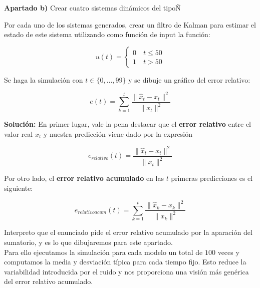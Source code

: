 \documentclass[a4paper]{article}
\begin{document}
\textbf{Apartado b)} Crear cuatro sistemas dinámicos del tipoÑ

Por cada uno de los sistemas generados, crear un filtro de Kalman para estimar el estado de este sistema utilizando como función de input la función:

\[
	u(t) = \begin{cases}
		0 \quad t \le 50 \\
		1 \quad t > 50
	\end{cases}
\]

Se haga la simulación con $t \in \{0, \ldots, 99\}$ y se dibuje un gráfico del error relativo:

\[
	e(t) = \sum_{k=1}^{t} \frac{\parallel\hat x_t - x_t\parallel^2}{\parallel x_t \parallel^2}
\]

\textbf{Solución:} En primer lugar, vale la pena destacar que el \textbf{error relativo} entre el valor real $x_t$ y nuestra predicción viene dado por la expresión

\[
	e_{relativo}(t) =\frac{\parallel\hat x_t - x_t\parallel^2}{\parallel x_t \parallel^2}
\]

Por otro lado, el \textbf{error relativo acumulado} en las $t$ primeras predicciones es el siguiente:

\[
	e_{relativo acum}(t) = \sum_{k=1}^{t} \frac{\parallel\hat x_k - x_k\parallel^2}{\parallel x_k \parallel^2}
\]

Interpreto que el enunciado pide el error relativo acumulado por la aparación del sumatorio, y es lo que dibujaremos para este apartado. \\

Para ello ejecutamos la simulación para cada modelo un total de $100$ veces y computamos la media y desviación típica para cada tiempo fijo. Esto reduce la variabilidad introducida por el ruido y nos proporciona una visión más genérica del error relativo acumulado.
\end{document}
